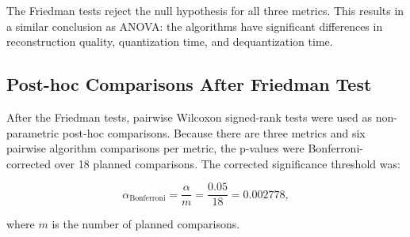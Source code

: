 \documentclass[11pt]{article}
\begin{document}
The Friedman tests reject the null hypothesis for all three metrics.
This results in a similar conclusion as ANOVA: the algorithms have significant differences in reconstruction quality, quantization time, and dequantization time.

\subsection{Post-hoc Comparisons After Friedman Test}

After the Friedman tests, pairwise Wilcoxon signed-rank tests were used as non-parametric post-hoc comparisons.
Because there are three metrics and six pairwise algorithm comparisons per metric, the p-values were Bonferroni-corrected over 18 planned comparisons.
The corrected significance threshold was:

\[
\alpha_{\mathrm{Bonferroni}} = \frac{\alpha}{m}
= \frac{0.05}{18}
= 0.002778,
\]

where \(m\) is the number of planned comparisons.
\end{document}
